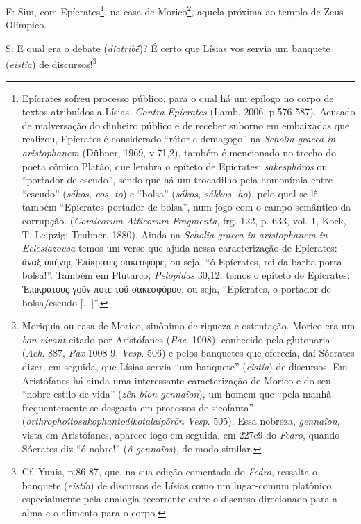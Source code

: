 F: Sim, com Epícrates\footnote{Epícrates sofreu processo público, para o
  qual há um epílogo no corpo de textos atribuídos a Lísias,
  \emph{Contra} \emph{Epícrates} (Lamb, 2006, p.576-587). Acusado de
  malversação do dinheiro público e de receber suborno em embaixadas que
  realizou, Epícrates é considerado ``rétor e demagogo'' na
  \emph{Scholia graeca in aristophanem} (Dübner, 1969, v.71,2), também é
  mencionado no trecho do poeta cômico Platão, que lembra o epíteto de
  Epícrates: \emph{sakesphóros} ou ``portador de escudo'', sendo que há
  um trocadilho pela homonímia entre ``escudo'' (\emph{sákos, eos, to})
  e ``bolsa'' (\emph{sákos, sákkos, ho}), pelo qual se lê também
  ``Epícrates portador de bolsa'', num jogo com o campo semântico da
  corrupção. (\emph{Comicorum Atticorum Fragmenta}, frg. 122, p. 633,
  vol. 1, Kock, T. Leipzig: Teubner, 1880). Ainda na \emph{Scholia
  graeca in aristophanem} \emph{in Eclesiazousa} temos um verso que
  ajuda nessa caracterização de Epícrates: ἄναξ ὑπήνης Ἐπίκρατες
  σακεσφόρε, ou seja, ``ó Epícrates, rei da barba porta-bolsa!''. Também
  em Plutarco, \emph{Pelopidas} 30,12, temos o epíteto de Epícrates:
  Ἐπικράτους γοῦν ποτε τοῦ σακεσφόρου, ou seja, ``Epícrates, o portador
  de bolsa/escudo {[}...{]}''.}, na casa de Morico\footnote{Moriquia ou
  casa de Morico, sinônimo de riqueza e ostentação. Morico era um
  \emph{bon-vivant} citado por Aristófanes (\emph{Pac}. 1008), conhecido
  pela glutonaria (\emph{Ach}. 887, \emph{Pax} 1008-9, \emph{Vesp}. 506)
  e pelos banquetes que oferecia, daí Sócrates dizer, em seguida, que
  Lísias servia ``um banquete'' (\emph{eistía}) de discursos. Em
  Aristófanes há ainda uma interessante caracterização de Morico e do
  seu ``nobre estilo de vida'' (\emph{zên bíon gennaîon}), um homem que
  ``pela manhã frequentemente se desgasta em processos de sicofanta''
  (\emph{orthrophoitosukophantodikotalaipṓrōn Vesp}. 505). Essa nobreza,
  \emph{gennaîon,} vista em Aristófanes, aparece logo em seguida, em
  227c9 do \emph{Fedro}, quando Sócrates diz ``ó nobre!'' (\emph{ô
  gennaîos}), de modo similar.}, aquela próxima ao templo de Zeus
Olímpico.

S: E qual era o debate (\emph{diatribḗ})? É certo que Lísias vos servia
um banquete (\emph{eistía}) de discursos!\footnote{Cf. Yunis, p.86-87,
  que, na sua edição comentada do \emph{Fedro}, ressalta o banquete
  (\emph{eistía}) de discursos de Lísias como um lugar-comum platônico,
  especialmente pela analogia recorrente entre o discurso direcionado
  para a alma e o alimento para o corpo.}

